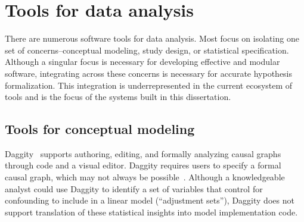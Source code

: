 


\section{Tools for data analysis}


There are numerous software tools for data analysis. Most focus on isolating one
set of concerns--conceptual modeling, study design, or statistical
specification. Although a singular focus is necessary for developing effective
and modular software, integrating across these concerns is necessary for
accurate hypothesis formalization. This integration is underrepresented in the
current ecosystem of tools and is the focus of the systems built in this
dissertation.


\subsection{Tools for conceptual modeling}
Daggity~\cite{textor2011dagitty} supports authoring, editing, and
formally analyzing causal graphs through code and a visual editor. Daggity
requires users to specify a formal causal graph, which may not always be
possible~\cite{suzuki2020causal,suzuki2018mechanisms,velentgas2013developing}.
Although a knowledgeable analyst could use Daggity to identify a set of
variables that control for confounding to include in a linear model
(``adjustment sets''), Daggity does not support translation of these statistical
insights into model implementation code. 

